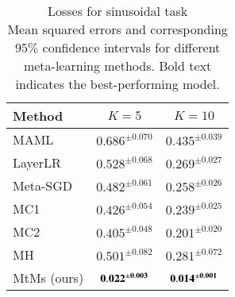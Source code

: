 \documentclass[3p,times,twocolumn]{elsarticle}
\begin{document}
\begin{table}[!htbp]
    \fontsize{7}{7}\selectfont
    \centering %
    \begin{tabular}{l c c} %
        \toprule
        Method                                             & $K=5$               & $K=10$              \\
        \midrule
        MAML \citep{finnModelAgnosticMetaLearningFast2017} & $0.686^{\pm 0.070}$ & $0.435^{\pm 0.039}$ \\ %
        LayerLR \citep{parkMetacurvature2019}              & $0.528^{\pm 0.068}$ & $0.269^{\pm 0.027}$ \\
        Meta-SGD \citep{liMetaSGDLearningLearn2017}        & $0.482^{\pm 0.061}$ & $0.258^{\pm 0.026}$ \\
        MC1 \citep{parkMetacurvature2019}                  & $0.426^{\pm 0.054}$ & $0.239^{\pm 0.025}$ \\
        MC2 \citep{parkMetacurvature2019}                  & $0.405^{\pm 0.048}$ & $0.201^{\pm 0.020}$ \\
        MH \citep{zhaoMetaLearningHypernetworks2020}       & $0.501^{\pm 0.082}$ & $0.281^{\pm 0.072}$ \\
        MtMs (ours)                                        & $\bf 0.022^{\pm 0.003}$ & $\bf 0.014^{\pm 0.001}$ \\
        \bottomrule %
    \end{tabular}
    \caption{
        Losses for sinusoidal task\\
        Mean squared errors and corresponding $95\%$ confidence intervals for different meta-learning methods.
        Bold text indicates the best-performing model.
    } %
    \label{tab:sinLosses} %
\end{table}
\end{document}
